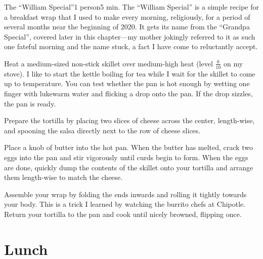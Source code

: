\begin{recipe}{The \enquote{William Special}}{1 person}{5 min.}
\freeform The \enquote{William Special} is a simple recipe for a breakfast wrap
that I used to make every morning, religiously, for a period of several months
near the beginning of 2020. It gets its name from the \enquote{Grandpa Special},
covered later in this chapter---my mother jokingly referred to it as such one
fateful morning and the name stuck, a fact I have come to reluctantly accept.

\newstep Heat a medium-sized non-stick skillet over medium-high heat (level
$\frac{6}{10}$ on my stove).  I like to start the kettle boiling for tea while
I wait for the skillet to come up to temperature. You can test whether the pan
is hot enough by wetting one finger with lukewarm water and flicking a drop onto
the pan. If the drop sizzles, the pan is ready.

Prepare the tortilla by placing two slices of cheese across the center,
length-wise, and spooning the salsa directly next to the row of cheese
slices.

Place a knob of butter into the hot pan. When the butter has melted, crack
two eggs into the pan and stir vigorously until curds begin to form. When the
eggs are done, quickly dump the contents of the skillet onto your tortilla
and arrange them length-wise to match the cheese.

\newstep Assemble your wrap by folding the ends inwards and rolling
it tightly towards your body. This is a trick I learned by watching the
burrito chefs at Chipotle\texttrademark. Return your tortilla to the pan
and cook until nicely browned, flipping once.
\end{recipe}

\section{Lunch}
\label{sec:findlay-lunch}


